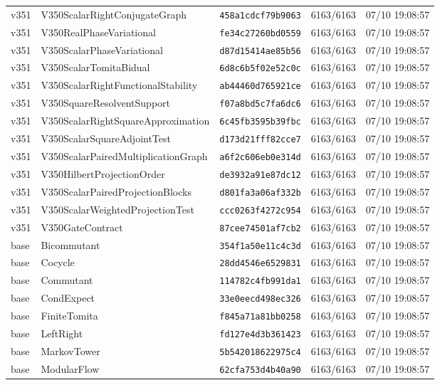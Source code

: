 \documentclass[11pt]{article}
\theoremstyle{definition}\newtheorem{deriv}{Derivation}
\begin{document}
{\begin{longtable}{@{}lllll@{}}
v351 & V350ScalarRightConjugateGraph & \texttt{458a1cdcf79b9063} & 6163/6163 & 07/10 19:08:57 \\
v351 & V350RealPhaseVariational & \texttt{fe34c27260bd0559} & 6163/6163 & 07/10 19:08:57 \\
v351 & V350ScalarPhaseVariational & \texttt{d87d15414ae85b56} & 6163/6163 & 07/10 19:08:57 \\
v351 & V350ScalarTomitaBidual & \texttt{6d8c6b5f02e52c0c} & 6163/6163 & 07/10 19:08:57 \\
v351 & V350ScalarRightFunctionalStability & \texttt{ab44460d765921ce} & 6163/6163 & 07/10 19:08:57 \\
v351 & V350SquareResolventSupport & \texttt{f07a8bd5c7fa6dc6} & 6163/6163 & 07/10 19:08:57 \\
v351 & V350ScalarRightSquareApproximation & \texttt{6c45fb3595b39fbc} & 6163/6163 & 07/10 19:08:57 \\
v351 & V350ScalarSquareAdjointTest & \texttt{d173d21fff82cce7} & 6163/6163 & 07/10 19:08:57 \\
v351 & V350ScalarPairedMultiplicationGraph & \texttt{a6f2c606eb0e314d} & 6163/6163 & 07/10 19:08:57 \\
v351 & V350HilbertProjectionOrder & \texttt{de3932a91e87dc12} & 6163/6163 & 07/10 19:08:57 \\
v351 & V350ScalarPairedProjectionBlocks & \texttt{d801fa3a06af332b} & 6163/6163 & 07/10 19:08:57 \\
v351 & V350ScalarWeightedProjectionTest & \texttt{ccc0263f4272c954} & 6163/6163 & 07/10 19:08:57 \\
v351 & V350GateContract & \texttt{87cee74501af7cb2} & 6163/6163 & 07/10 19:08:57 \\
base & Bicommutant & \texttt{354f1a50e11c4c3d} & 6163/6163 & 07/10 19:08:57 \\
base & Cocycle & \texttt{28dd4546e6529831} & 6163/6163 & 07/10 19:08:57 \\
base & Commutant & \texttt{114782c4fb991da1} & 6163/6163 & 07/10 19:08:57 \\
base & CondExpect & \texttt{33e0eecd498ec326} & 6163/6163 & 07/10 19:08:57 \\
base & FiniteTomita & \texttt{f845a71a81bb0258} & 6163/6163 & 07/10 19:08:57 \\
base & LeftRight & \texttt{fd127e4d3b361423} & 6163/6163 & 07/10 19:08:57 \\
base & MarkovTower & \texttt{5b542018622975c4} & 6163/6163 & 07/10 19:08:57 \\
base & ModularFlow & \texttt{62cfa753d4b40a90} & 6163/6163 & 07/10 19:08:57 \\

\end{longtable}}
\end{document}
